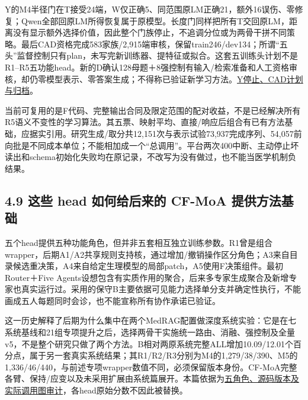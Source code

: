 \documentclass[
  11pt,
  a4paper,
]{article}
\begin{document}
Y的M4半径门在T接受24端，W仅正确5、同范围原LM正确21，额外16误伤、零修复；Qwen全部回原LM所得恢复属于原模型。长度门同样把所有T交回原LM，距离没有显示额外选择价值，因此整个门族停止，不追调分位或为两骨干拼不同策略。最后CAD资格完成583家族/2,915端审核，保留train246/dev134；所谓``五头''监督控制只有plan，未写完新训练器、提特征或拟合。这套五训练头计划不是R1--R5五功能head。新的D确认128母题＋8强控制有输入/检索准备和人工资格审核，却仍零模型表示、零答案生成；不得称已验证新学习方法。\href{https://github.com/xiotakut/cf_mrg/blob/main/papers/2026-10-02_cf_moa/author_dossier/records/research/r5_invariance_head.md\#L972}{Y停止、CAD计划与归档}。

当前可复用的是F代码、完整输出合同及限定范围的配对收益，不是已经解决所有R5语义不变性的学习算法。其五票、映射平均、直接/响应后组合有已有方法基础，应据实引用。研究生成/取分共12,151次与表示试验73,937完成序列、54,057前向批是不同成本单位；不能相加成一个``总调用''。平台两次400中断、主动停止坏读出和schema初始化失败均在原记录，不改写为没有做过，也不能当医学机制负结果。

\subsection{4.9 这些 head 如何给后来的 CF-MoA
提供方法基础}\label{ux8fd9ux4e9b-head-ux5982ux4f55ux7ed9ux540eux6765ux7684-cf-moa-ux63d0ux4f9bux65b9ux6cd5ux57faux7840}

五个head提供五种功能角色，但并非五套相互独立训练参数。R1曾是组合wrapper，后期A1/A2共享规则支持核，通过增加/撤销操作区分角色；A3来自目录候选重决策，A4来自给定生理模型的局部patch，A5使用F决策组件。最初Router＋Five
Agents设想包含有实质作用的聚合，后来多专家生成聚合及新增专家也真实运行过。采用的保守B主要依据可见能力选择单分支并确定性执行，不能画成五人每题同时会诊，也不能宣称所有协作承诺已验证。

这一历史解释了后期为什么集中在两个MedRAG配置做深度系统实验：它是在七系统基线和21组专项提升之后，选择两骨干实施统一路由、消融、强控制及全量v5，不是整个研究只做了两个方法。B相对两原系统完整ALL增加10.09/12.01个百分点，属于另一套真实系统结果；其R1/R2/R3分别为M4的1,279/38/390、M5的1,336/46/440，与前述专项wrapper数值不同，必须保留版本身份。CF-MoA完整各臂、保持/应变以及未采用扩展由系统篇展开。本篇依据为\href{https://github.com/xiotakut/cf_mrg/blob/main/papers/2026-10-02_cf_moa/author_dossier/sources/2c8121d3938b_five_agent_framework_audit.json}{五角色、源码版本及实际调用图审计}，各head原始分数不因此被替换。

\label{cf-moa-path}
\end{document}
